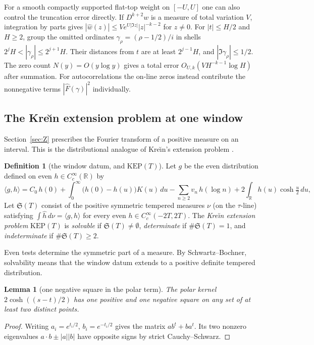 \documentclass[10pt]{amsart}
\newtheorem{lemma}[theorem]{Lemma}
\theoremstyle{definition}
\newtheorem{definition}[theorem]{Definition}
\theoremstyle{remark}
\newcommand{\R}{\mathbb R}
\begin{document}
For a smooth compactly supported flat-top weight on $[-U,U]$ one
can also control the truncation error directly. If $D^{k+2}w$ is a
measure of total variation $V$, integration by parts gives
$|\widehat w(z)|\le Ve^{U|\Im z|}|z|^{-k-2}$ for $z\ne0$.
For $|t|\le H/2$ and $H\ge2$, group the omitted ordinates
$\gamma_\rho=(\rho-1/2)/i$ in shells
$2^jH<|\gamma_\rho|\le2^{j+1}H$. Their distances from $t$ are
at least $2^{j-1}H$, and $|\Im\gamma_\rho|\le1/2$.
The zero count $N(y)=O(y\log y)$ gives a total error
$O_{U,k}(VH^{-k-1}\log H)$ after summation. For autocorrelations
the on-line zeros instead contribute the nonnegative terms
$|\widehat F(\gamma)|^2$ individually.

\subsection{The Kre\u{\i}n extension problem at one window}\label{subsec:KEP}
Section~\ref{sec:Z} prescribes the Fourier transform of a positive measure on an interval.
This is the distributional analogue of Kre\u{\i}n's extension problem
\cite{Krein1940,Sasvari1994}.

\begin{definition}[the window datum, and $\mathrm{KEP}(T)$]\label{def:KEP}
Let $g$ be the even distribution defined on even $h\in C_c^\infty(\R)$ by
\begin{equation}\label{eq:gdatum}
\langle g,h\rangle=C_0\,h(0)+\int_0^\infty\big(h(0)-h(u)\big)K(u)\,du-\sum_{n\ge2}v_n\,h(\log n)
+2\int_\R h(u)\cosh\tfrac u2\,du,
\end{equation}
Let $\mathfrak S(T)$ consist of the positive
symmetric tempered measures $\nu$ (on the $\tau$-line) satisfying $\int\widehat h\,d\nu=\langle g,h\rangle$
for every even $h\in C_c^\infty(-2T,2T)$.
The \emph{Kre\u{\i}n extension problem} $\mathrm{KEP}(T)$ is \emph{solvable} if
$\mathfrak S(T)\ne\emptyset$, \emph{determinate} if $\#\mathfrak S(T)=1$, and \emph{indeterminate}
if $\#\mathfrak S(T)\ge2$.
\end{definition}
Even tests determine the symmetric part of a measure. By Schwartz--Bochner,
solvability means that the window datum extends to a positive definite tempered distribution.

\begin{lemma}[one negative square in the polar term]\label{lem:polar}
The polar kernel $2\cosh((s-t)/2)$ has one positive and one negative
square on any set of at least two distinct points.
\end{lemma}
\begin{proof}
Writing $a_i=e^{t_i/2}$, $b_i=e^{-t_i/2}$ gives the matrix $ab^t+ba^t$.
Its two nonzero eigenvalues $a\cdot b\pm|a||b|$ have opposite signs
by strict Cauchy--Schwarz.
\end{proof}
\end{document}
